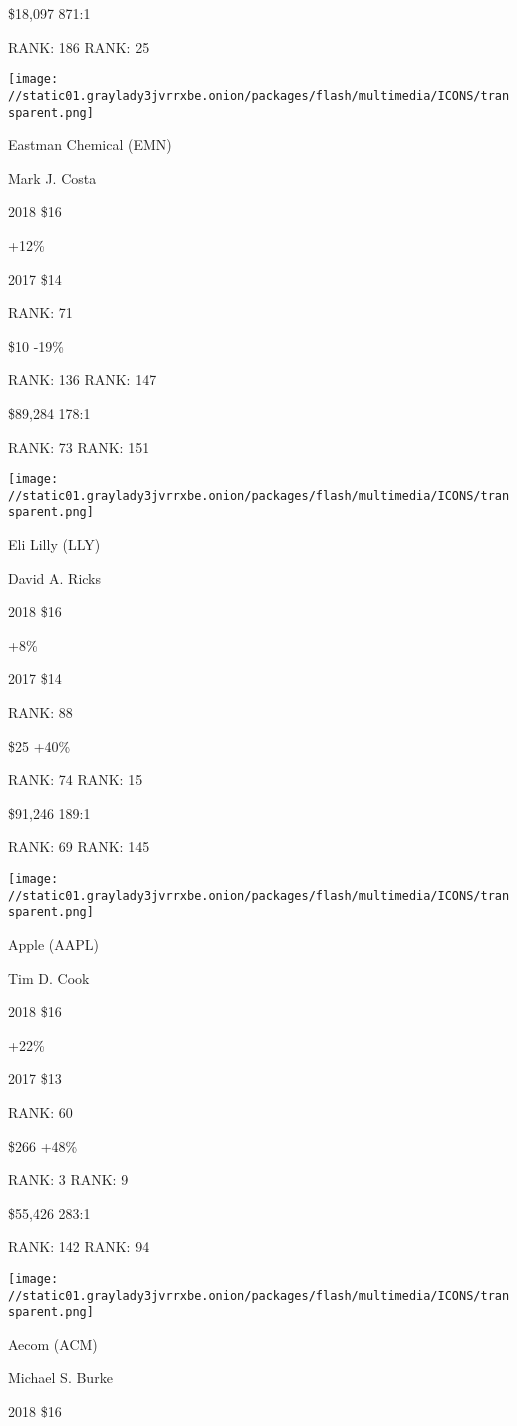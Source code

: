  \$18,097 871:1

RANK: 186 RANK: 25

\texttt{[image: //static01.graylady3jvrrxbe.onion/packages/flash/multimedia/ICONS/transparent.png]}

Eastman Chemical (EMN)

Mark J. Costa \protect\hyperlink{g-footnotes}{}

2018 \$16

 +12\%

2017 \$14

RANK: 71

 \$10 -19\%

RANK: 136 RANK: 147

 \$89,284 178:1

RANK: 73 RANK: 151

\texttt{[image: //static01.graylady3jvrrxbe.onion/packages/flash/multimedia/ICONS/transparent.png]}

Eli Lilly (LLY)

David A. Ricks \protect\hyperlink{g-footnotes}{}

2018 \$16

 +8\%

2017 \$14

RANK: 88

 \$25 +40\%

RANK: 74 RANK: 15

 \$91,246 189:1

RANK: 69 RANK: 145

\texttt{[image: //static01.graylady3jvrrxbe.onion/packages/flash/multimedia/ICONS/transparent.png]}

Apple (AAPL)

Tim D. Cook \protect\hyperlink{g-footnotes}{}

2018 \$16

 +22\%

2017 \$13

RANK: 60

 \$266 +48\%

RANK: 3 RANK: 9

 \$55,426 283:1

RANK: 142 RANK: 94

\texttt{[image: //static01.graylady3jvrrxbe.onion/packages/flash/multimedia/ICONS/transparent.png]}

Aecom (ACM)

Michael S. Burke \protect\hyperlink{g-footnotes}{}

2018 \$16

